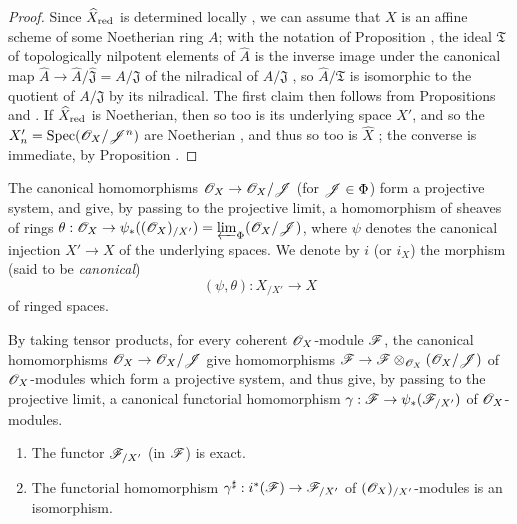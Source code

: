 \begin{proof}
\label{proof-1.10.8.6}
Since $\widehat{X}_{\mathrm{red}}$ is determined locally , we can assume that $X$ is an affine scheme of some Noetherian ring $A$; with the notation of Proposition , the ideal $\mathfrak{T}$ of topologically nilpotent elements of $\widehat{A}$ is the inverse image under the canonical map $\widehat{A}\to\widehat{A}/\widehat{\mathfrak{J}}=A/\mathfrak{J}$ of the nilradical of $A/\mathfrak{J}$ , so $\widehat{A}/\mathfrak{T}$ is isomorphic to the quotient of $A/\mathfrak{J}$ by its nilradical.
The first claim then follows from Propositions  and .
If $\widehat{X}_{\mathrm{red}}$ is Noetherian, then so too is its underlying space $X'$, and so the $X_n'=\operatorname{Spec}(\mathscr{O}_X/\mathscr{J}^n)$ are Noetherian , and thus so too is $\widehat{X}$ ; the converse is immediate, by Proposition .
\end{proof}

\begin{env}[10.8.7]
\label{1.10.8.7}
The canonical homomorphisms $\sh{O}_X\to\sh{O}_X/\sh{J}$ (for $\mathscr{J}\in\Phi$) form a projective system, and give, by passing to the projective limit, a homomorphism of sheaves of rings $\theta:\sh{O}_X\to\psi_*((\sh{O}_X)_{/X'})=\varprojlim_\Phi(\sh{O}_X/\sh{J})$, where $\psi$ denotes the canonical injection $X'\to X$ of the underlying spaces.
We denote by $i$ (or $i_X$) the morphism (said to be \emph{canonical})
\[
  (\psi,\theta):X_{/X'}\to X
\]
of ringed spaces.

By taking tensor products, for every coherent $\mathscr{O}_X$-module $\mathscr{F}$, the canonical homomorphisms $\sh{O}_X\to\sh{O}_X/\sh{J}$ give homomorphisms $\sh{F}\to\sh{F}\otimes_{\sh{O}_X}(\sh{O}_X/\sh{J})$ of $\mathscr{O}_X$-modules which form a projective system, and thus give, by passing to the projective limit, a canonical functorial homomorphism $\gamma:\sh{F}\to\psi_*(\sh{F}_{/X'})$ of $\mathscr{O}_X$-modules.
\end{env}

\begin{proposition}[10.8.8]
\label{1.10.8.8}
\medskip\noindent
\begin{enumerate}[label=\emph{(\roman*)}]
  \item The functor $\mathscr{F}_{/X'}$ (in $\mathscr{F}$) is exact.
  \item The functorial homomorphism $\gamma^\sharp:i^*(\sh{F})\to\sh{F}_{/X'}$ of $(\mathscr{O}_X)_{/X'}$-modules is an isomorphism.
\end{enumerate}
\end{proposition}


